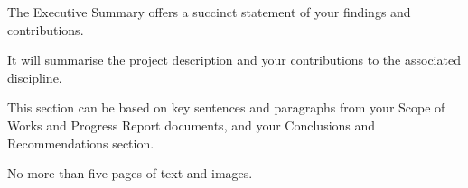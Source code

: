 The Executive Summary offers a succinct statement of your findings and contributions.

It will summarise the project description and your contributions to the associated discipline.  

This section can be based on key sentences and paragraphs from your Scope of Works and Progress Report documents, and your Conclusions and Recommendations section.

No more than five pages of text and images.